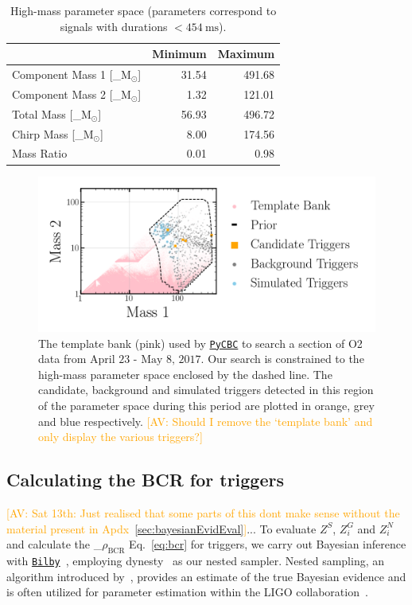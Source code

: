 \documentclass[%
 nofootinbib,
 amsmath,amssymb,
 aps,
 twocolumn
]{revtex4-2}
\newcommand{\bilby}{{\sc \href{https://lscsoft.docs.ligo.org/bilby/}{\texttt{Bilby}}}\xspace}
\newcommand{\dynesty}{{\sc dynesty}\xspace}
\newcommand{\pycbc}{{\sc \href{https://pycbc.org/}{\texttt{PyCBC}}}\xspace}
\newcommand{\mathcmd}[1]{{\sc \relax\ifmmode#1\else $#1$\fi}\xspace}
\newcommand{\bcr}{\mathcmd{\rho_\text{BCR}}}
\newcommand{\msun}{\mathcmd{\text{M}_\odot}}
\newcommand{\avi}[1]{\textcolor{orange}{[AV: #1]}}
\begin{document}
\begin{table}[t]

\caption[BBH parameters correspond to duration $<454\ \text{ms}$]{\label{tab:parameters}High-mass parameter space (parameters correspond to signals with durations $<454 \ \text{ms}$). }
\centering
\begin{tabular}{lrr}
\toprule
  & Minimum & Maximum\\
\midrule
Component Mass 1 [\msun] & 31.54 & 491.68\\
Component Mass 2 [\msun] & 1.32 & 121.01\\
Total Mass [\msun] & 56.93 & 496.72\\
Chirp Mass [\msun] & 8.00 & 174.56\\
Mass Ratio & 0.01 & 0.98\\
\end{tabular}
\end{table}



\begin{figure}[!ht]

{\centering \includegraphics[width=0.75\linewidth]{images/template_bank.png}

}
\caption[High-mass BCR search space.]{The template bank (pink) used by \pycbc to search a section of O2 data from $\text{April 23 - May 8, 2017}$. Our search is constrained to the high-mass parameter space enclosed by the dashed line. The candidate, background and simulated triggers detected in this region of the parameter space during this period are plotted in orange, grey and blue respectively.  \avi{Should I remove the `template bank' and only display the various triggers?}}\label{fig:templateBank}
\end{figure}


\subsection{Calculating the BCR for triggers}
\avi{Sat 13th: Just realised that some parts of this dont make sense without the material present in Apdx~\ref{sec:bayesianEvidEval}}...
To evaluate $Z^S$, $Z^G_i$ and $Z^N_i$ and calculate the \bcr Eq.~\ref{eq:bcr} for triggers, we carry out Bayesian inference with \bilby~\cite{bilby, bilby_pipe}, employing \dynesty~\cite{dynesty} as our nested sampler. Nested sampling, an algorithm introduced by~\citet{skilling2004, skilling2006}, provides an estimate of the true Bayesian evidence and is often utilized for parameter estimation within the LIGO collaboration~\cite{bilby, bilby_paper, pbilby_paper}.
\end{document}
